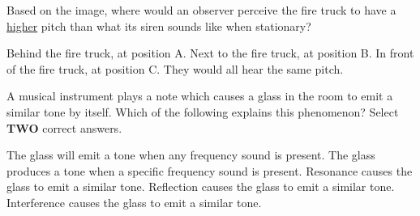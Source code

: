 \documentclass[answers]{exam}
\begin{document}
\begin{questions}


\ifprintanswers \else \clearpage \fi

\question
Based on the image, where would an observer perceive the fire truck to have a \underline{higher} pitch than what its siren sounds like when stationary?

\begin{center}
\end{center}


\begin{randomizechoices}[norandomize]
    \choice Behind the fire truck, at position A.
    \choice Next to the fire truck, at position B.
    \correctchoice In front of the fire truck, at position C.
    \choice They would all hear the same pitch.
\end{randomizechoices}

\question
A musical instrument plays a note which causes a glass in the room to emit a similar tone by itself. Which of the following explains this phenomenon?
Select \textbf{TWO} correct answers.

\begin{randomizechoices}
    \choice The glass will emit a tone when any frequency sound is present.
    \correctchoice The glass produces a tone when a specific frequency sound is present.
    \correctchoice Resonance causes the glass to emit a similar tone.
    \choice Reflection causes the glass to emit a similar tone.
    \choice Interference causes the glass to emit a similar tone.
\end{randomizechoices}


\end{questions}
\end{document}
